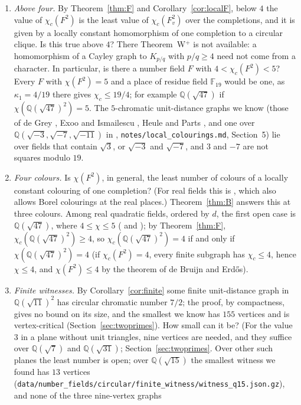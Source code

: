 \documentclass[11pt,a4paper]{amsart}
\theoremstyle{remark}
\newcommand{\Q}{\mathbb{Q}}
\newcommand{\F}{\mathbb{F}}
\begin{document}
\begin{enumerate}
\item \emph{Above four.} By Theorem~\ref{thm:F} and Corollary~\ref{cor:localF}, below $4$ the value of
$\chi_c(F^2)$ is the least value of $\chi_c(F_v^2)$ over the completions, and it is given by a locally constant
homomorphism of one completion to a circular clique. Is this true above $4$? There Theorem~W$^+$ is not available: a
homomorphism of a Cayley graph to $K_{p/q}$ with $p/q\ge4$ need not come from a character. In particular, is there a
number field $F$ with $4<\chi_c(F^2)<5$? Every $F$ with $\chi(F^2)=5$ and a place of residue field $\F_{19}$ would be
one, as $\kappa_1=4/19$ there gives $\chi_c\le19/4$; for example $\Q(\sqrt{47})$ if $\chi(\Q(\sqrt{47})^2)=5$. The
$5$-chromatic unit-distance graphs we know (those of de Grey \cite{deGrey}, Exoo and Ismailescu \cite{EI}, Heule
\cite{Heule} and Parts \cite{Parts}, and one over $\Q(\sqrt{-3},\sqrt{-7},\sqrt{-11})$ in \cite{Repo},
\nolinkurl{notes/local_colourings.md}, Section~5) lie over fields that contain $\sqrt3$, or $\sqrt{-3}$ and $\sqrt{-7}$,
and $3$ and $-7$ are not squares modulo $19$.
\item \emph{Four colours.} Is $\chi(F^2)$, in general, the least number of colours of a locally constant colouring
of one completion? (For real fields this is \cite[Question~8]{TC}, which also allows Borel colourings at the real
places.) Theorem~\ref{thm:B} answers this at three colours. Among real quadratic fields, ordered by $d$, the first open case
is $\Q(\sqrt{47})$, where
$4\le\chi\le5$ (\cite[Corollary~2]{FC} and \cite{Moorhouse}); by Theorem~\ref{thm:F}, $\chi_c(\Q(\sqrt{47})^2)\ge4$,
so $\chi_c(\Q(\sqrt{47})^2)=4$ if and only if $\chi(\Q(\sqrt{47})^2)=4$ (if $\chi_c(F^2)=4$, every finite subgraph has
$\chi_c\le4$, hence $\chi\le4$, and $\chi(F^2)\le4$ by the theorem of de Bruijn and Erd\H{o}s).
\item \emph{Finite witnesses.} By Corollary~\ref{cor:finite} some finite unit-distance graph in $\Q(\sqrt{11})^2$
has circular chromatic number $7/2$; the proof, by compactness, gives no bound on its size, and the smallest we know
has $155$ vertices and is vertex-critical (Section~\ref{sec:twoprimes}). How small can it be? (For the value $3$ in
a plane without unit triangles, nine vertices are needed, and they suffice over $\Q(\sqrt7)$ and $\Q(\sqrt{31})$;
Section~\ref{sec:twoprimes}. Over other such planes the least number is open; over $\Q(\sqrt{15})$ the smallest
witness we found has $13$ vertices
(\nolinkurl{data/number_fields/circular/finite_witness/witness_q15.json.gz}), and none of the three nine-vertex graphs

\end{enumerate}
\end{document}

